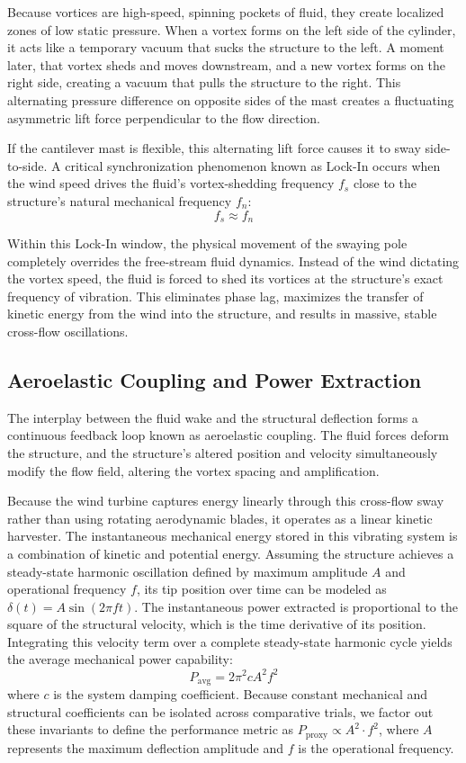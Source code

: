 \documentclass[11pt,a4paper]{article}
\begin{document}
Because vortices are high-speed, spinning pockets of fluid, they create localized zones of low static pressure. When a vortex forms on the left side of the cylinder, it acts like a temporary vacuum that sucks the structure to the left. A moment later, that vortex sheds and moves downstream, and a new vortex forms on the right side, creating a vacuum that pulls the structure to the right. This alternating pressure difference on opposite sides of the mast creates a fluctuating asymmetric lift force perpendicular to the flow direction.

If the cantilever mast is flexible, this alternating lift force causes it to sway side-to-side. A critical synchronization phenomenon known as Lock-In occurs when the wind speed drives the fluid's vortex-shedding frequency $f_s$ close to the structure’s natural mechanical frequency $f_n$:
\begin{equation}
f_s \approx f_n
\end{equation}

Within this Lock-In window, the physical movement of the swaying pole completely overrides the free-stream fluid dynamics. Instead of the wind dictating the vortex speed, the fluid is forced to shed its vortices at the structure's exact frequency of vibration. This eliminates phase lag, maximizes the transfer of kinetic energy from the wind into the structure, and results in massive, stable cross-flow oscillations.

\subsection{Aeroelastic Coupling and Power Extraction}
The interplay between the fluid wake and the structural deflection forms a continuous feedback loop known as aeroelastic coupling. The fluid forces deform the structure, and the structure’s altered position and velocity simultaneously modify the flow field, altering the vortex spacing and amplification.

Because the wind turbine captures energy linearly through this cross-flow sway rather than using rotating aerodynamic blades, it operates as a linear kinetic harvester. The instantaneous mechanical energy stored in this vibrating system is a combination of kinetic and potential energy. Assuming the structure achieves a steady-state harmonic oscillation defined by maximum amplitude $A$ and operational frequency $f$, its tip position over time can be modeled as $\delta(t) = A \sin(2\pi f t)$. The instantaneous power extracted is proportional to the square of the structural velocity, which is the time derivative of its position. Integrating this velocity term over a complete steady-state harmonic cycle yields the average mechanical power capability:
\begin{equation}
P_{\text{avg}} = 2 \pi^2 c A^2 f^2
\end{equation}
where $c$ is the system damping coefficient. Because constant mechanical and structural coefficients can be isolated across comparative trials, we factor out these invariants to define the performance metric as $P_{\text{proxy}} \propto A^2 \cdot f^2$, where $A$ represents the maximum deflection amplitude and $f$ is the operational frequency.
\end{document}
